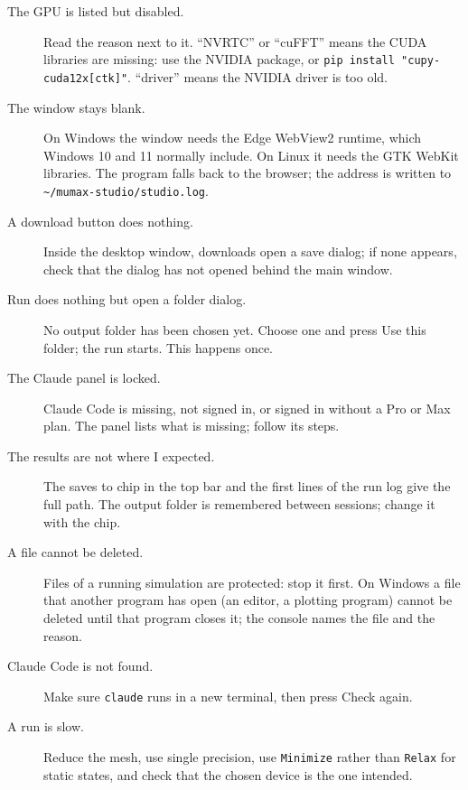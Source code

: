 \documentclass[11pt,a4paper,oneside]{book}
\newcommand{\code}[1]{\texttt{#1}}
\renewcommand{\_}{\textunderscore\allowbreak}
\newcommand{\menu}[1]{\textsf{#1}}
\begin{document}
\begin{description}
\item[The GPU is listed but disabled.] Read the reason next to it. ``NVRTC'' or ``cuFFT'' means the CUDA
libraries are missing: use the NVIDIA package, or \code{pip install "cupy-cuda12x[ctk]"}. ``driver'' means the
NVIDIA driver is too old.
\item[The window stays blank.] On Windows the window needs the Edge WebView2 runtime, which Windows 10 and 11
normally include. On Linux it needs the GTK WebKit libraries. The program falls back to the browser; the address
is written to \code{\textasciitilde/mumax-studio/studio.log}.
\item[A download button does nothing.] Inside the desktop window, downloads open a save dialog; if none appears,
check that the dialog has not opened behind the main window.
\item[Run does nothing but open a folder dialog.] No output folder has been chosen yet. Choose one and press
\menu{Use this folder}; the run starts. This happens once.
\item[The Claude panel is locked.] Claude Code is missing, not signed in, or signed in without a Pro or Max plan.
The panel lists what is missing; follow its steps.
\item[The results are not where I expected.] The \menu{saves to} chip in the top bar and the first lines of
the run log give the full path. The output folder is remembered between sessions; change it with the chip.
\item[A file cannot be deleted.] Files of a running simulation are protected: stop it first. On Windows a file
that another program has open (an editor, a plotting program) cannot be deleted until that program closes it;
the console names the file and the reason.
\item[Claude Code is not found.] Make sure \code{claude} runs in a new terminal, then press \menu{Check again}.
\item[A run is slow.] Reduce the mesh, use single precision, use \code{Minimize} rather than \code{Relax} for
static states, and check that the chosen device is the one intended.
\end{description}
\end{document}
